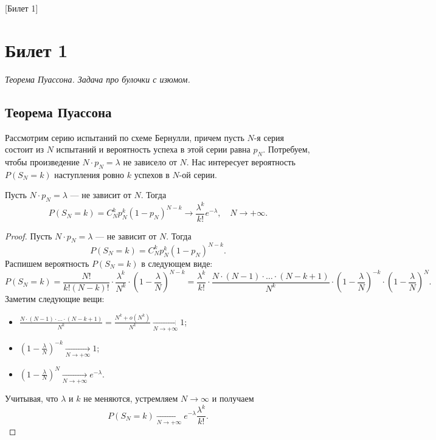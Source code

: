 [Билет 1]

\section{Билет 1}

\begin{center}
    \it Теорема Пуассона.
    Задача про булочки с изюмом.
\end{center}

\sectionbreak
\subsection{Теорема Пуассона}

Рассмотрим серию испытаний по схеме Бернулли, причем пусть $N$-я серия состоит из $N$ испытаний и вероятность успеха в этой серии равна $p_N$.
Потребуем, чтобы произведение $N\cdot p_N=\lambda$ не зависело от $N$.
Нас интересует вероятность $P(S_N=k)$ наступления ровно $k$ успехов в $N$-ой серии.

\begin{theorem*}
    Пусть $N \cdot p_N = \lambda$ --- не зависит от $N$.
    Тогда
    \[
        P(S_N = k) = C_{N}^k p_N^k (1 - p_N)^{N - k} \to \frac{\lambda^k}{k!} e^{-\lambda}, \quad N \to +\infty.
    \]
\end{theorem*}

\begin{proof}
    Пусть $N\cdot p_N=\lambda$ --- не зависит от $N$. Тогда
    \[
        P(S_N = k) = C_{N}^k p_N^k (1 - p_N)^{N - k}.
    \]
    Распишем вероятность $P(S_N = k)$ в следующем виде:
    \[
        P(S_N = k) = \frac{N!}{k!(N - k)!} \cdot \frac{\lambda^{k}}{N^{k}} \cdot \left( 1 - \frac{\lambda}{N} \right)^{N - k} = \frac{\lambda^k}{k!} \cdot \frac{N \cdot (N - 1) \cdot \ldots \cdot (N - k + 1)}{N^{k}} \cdot \left(1 - \frac{\lambda}{N}\right)^{-k} \cdot \left(1 - \frac{\lambda}{N}\right)^{N}.
    \]
    Заметим следующие вещи:
    \begin{itemize}
        \item $\frac{N \cdot (N - 1) \cdot \ldots \cdot (N - k + 1)}{N^{k}} = \frac{N^{k} + o(N^{k})}{N^{k}} \underset{N \to +\infty}{\to} 1$;
        \item $\left(1 - \frac{\lambda}{N}\right)^{-k} \underset{N \to +\infty}{\to} 1$;
        \item $\left(1 - \frac{\lambda}{N}\right)^{N} \underset{N \to +\infty}{\to} e^{-\lambda}$.
    \end{itemize}
    Учитывая, что $\lambda$ и $k$ не меняются, устремляем $N \to \infty$ и получаем
    \[
        P(S_N = k) \underset{N \to +\infty}{\to} e^{-\lambda} \frac{\lambda^{k}}{k!}.
    \]
\end{proof}

